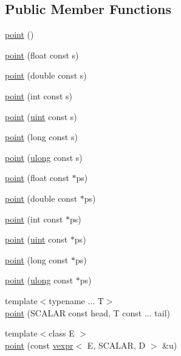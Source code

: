 \subsection*{Public Member Functions}
\begin{DoxyCompactItemize}
\item 
\hyperlink{structmui_1_1point_a94eacbdaa853f730373ad155e13095fc}{point} ()
\item 
\hyperlink{structmui_1_1point_aab70ef541ac82722d7e609c6a7df0aa7}{point} (float const s)
\item 
\hyperlink{structmui_1_1point_ad7ef46b9b3434f02f7405c4b480f7292}{point} (double const s)
\item 
\hyperlink{structmui_1_1point_a40a3e5bc095d10f264f8c28c4479c621}{point} (int const s)
\item 
\hyperlink{structmui_1_1point_adb4252fac3396a4c046dbd83f27ab2f7}{point} (\hyperlink{namespacemui_af15a3e7188a2117fb9965277bb0cacd2}{uint} const s)
\item 
\hyperlink{structmui_1_1point_ada0fa5ed73ff6466bb4c1e1329034694}{point} (long const s)
\item 
\hyperlink{structmui_1_1point_aeefa1c37118b31c8b95f029b30fccf17}{point} (\hyperlink{namespacemui_a9547f17257ee9191f5ca66284f9ca8ab}{ulong} const s)
\item 
\hyperlink{structmui_1_1point_a563cec9439adfcc7e3113f648ed8639e}{point} (float const $\ast$ps)
\item 
\hyperlink{structmui_1_1point_ac24536d40a20e4404fc98732b8ee2e29}{point} (double const $\ast$ps)
\item 
\hyperlink{structmui_1_1point_a24a0c75188dca81e9edc0d69ba680236}{point} (int const $\ast$ps)
\item 
\hyperlink{structmui_1_1point_aabafbe7f1a4aceab4c2663f5ec407ee2}{point} (\hyperlink{namespacemui_af15a3e7188a2117fb9965277bb0cacd2}{uint} const $\ast$ps)
\item 
\hyperlink{structmui_1_1point_ade60cb2a6851bf67c20688c0c4578dc0}{point} (long const $\ast$ps)
\item 
\hyperlink{structmui_1_1point_a2d64f04067003752bc9afb443550a676}{point} (\hyperlink{namespacemui_a9547f17257ee9191f5ca66284f9ca8ab}{ulong} const $\ast$ps)
\item 
{\footnotesize template$<$typename ... T$>$ }\\\hyperlink{structmui_1_1point_ae07d4abfec018c2977f6a814fd7ee36b}{point} (S\+C\+A\+L\+AR const head, T const ... tail)
\item 
{\footnotesize template$<$class E $>$ }\\\hyperlink{structmui_1_1point_a1d524275e1be730501e52f8ca466f375}{point} (const \hyperlink{structmui_1_1vexpr}{vexpr}$<$ E, S\+C\+A\+L\+AR, D $>$ \&u)

\end{DoxyCompactItemize}
